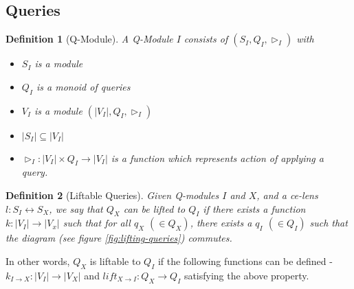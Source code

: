 \documentclass[a4paper,10pt]{article}
\newtheorem{definition}{Definition}
\begin{document}
\subsection{Queries}
\begin{definition}[Q-Module] A Q-Module $I$ consists of $(S_I,Q_I,\rhd_I)$ with
\begin{itemize}
\item $S_I$ is a module
\item $Q_I$ is a monoid of queries
\item $V_I$ is a module $(|V_I|,Q_I,\rhd_I)$
\item $|S_I| \subseteq |V_I|$
\item $\rhd_{I} : |V_I| \times Q_I \to |V_I|$ is a function which
  represents action of applying a query.


\end{itemize}
\end{definition} 

\begin{definition}[Liftable Queries]
Given Q-modules $I$ and $X$, and a ce-lens $l : S_I \leftrightarrow S_X$, we say that $Q_X$ can be lifted to $Q_I$ if there exists a function $k : |V_I| \to |V_x|$ such that for all $q_X$ $(\in Q_X)$, there exists a $q_I$ $(\in Q_I)$ such that the diagram (see figure \ref{fig:lifting-queries}) commutes.
\end{definition}

In other words, $Q_X$ is liftable to $Q_I$ if the following functions can be defined - $k_{I \to X}: |V_I|  \to|V_X|$ and $lift_{X \to I}: Q_X \to Q_I$ satisfying the above property. 
\end{document}
